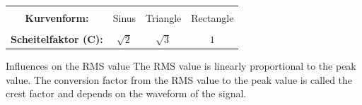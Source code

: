 \begin{frame}
{        \begin{table}[H]
            \centering%
        \begin{tabular}{ c c c c }
            \hline &&&\\[-6pt]
            \textbf{Kurvenform:}
                & Sinus
                & Triangle
                & Rectangle \\[+4pt]
            \hline &&&\\[-6pt]
            \textbf{Scheitelfaktor (C):}
                & $ \sqrt{2} $ 
                & $ \sqrt{3} $     
                & $ 1 $ \\[+4pt]
            \hline
        \end{tabular}
        \end{table}
    }


\end{frame}


\begin{frame}

    \begin{Key point}{Influences on the RMS value}
        The RMS value is linearly proportional to the peak value. The conversion factor from the RMS value to the peak value 
        is called the crest factor and depends on the waveform of the signal.
    \end{Key point}
\end{frame}



